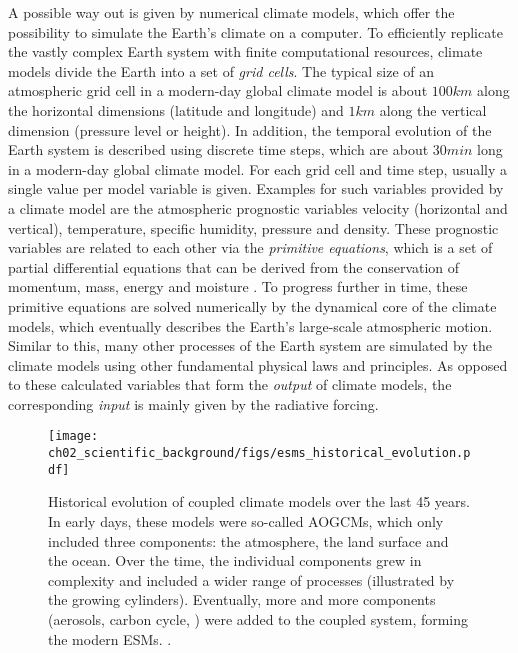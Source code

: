 A possible way out is given by numerical climate models, which offer the
possibility to simulate the Earth's climate on a computer. To efficiently
replicate the vastly complex Earth system with finite computational resources,
climate models divide the Earth into a set of \emph{grid cells}. The typical
size of an atmospheric grid cell in a modern-day global climate model is about
$100 \unit{km}$ along the horizontal dimensions (latitude and longitude) and $1
\unit{km}$ along the vertical dimension (pressure level or height). In
addition, the temporal evolution of the Earth system is described using
discrete time steps, which are about $30 \unit{min}$ long in a modern-day
global climate model. For each grid cell and time step, usually a single value
per model variable is given. Examples for such variables provided by a climate
model are the atmospheric prognostic variables velocity (horizontal and
vertical), temperature, specific humidity, pressure and density. These
prognostic variables are related to each other via the \emph{primitive
  equations}, which is a set of partial differential equations that can be
derived from the conservation of momentum, mass, energy and moisture
\autocite{Holton2004}. To progress further in time, these primitive equations
are solved numerically by the dynamical core of the climate models, which
eventually describes the Earth's large-scale atmospheric motion. Similar to
this, many other processes of the Earth system are simulated by the climate
models using other fundamental physical laws and principles. As opposed to
these calculated variables that form the \emph{output} of climate models, the
corresponding \emph{input} is mainly given by the radiative forcing.

\begin{figure}[t]
  \centering
  \texttt{[image: 
    ch02\_scientific\_background/figs/esms\_historical\_evolution.pdf]}
  \caption[
    Historical evolution of coupled climate models over the last 45 years.
  ]{
    Historical evolution of coupled climate models over the last 45 years. In
    early days, these models were so-called \acfp{AOGCM}, which only included
    three components: the atmosphere, the land surface and the ocean. Over the
    time, the individual components grew in complexity and included a wider
    range of processes (illustrated by the growing cylinders). Eventually, more
    and more components (aerosols, carbon cycle, \etc{}) were added to the
    coupled system, forming the modern \acfp{ESM}.
    .
  }
  \label{fig:02:esms_historical_evolution}
\end{figure}

